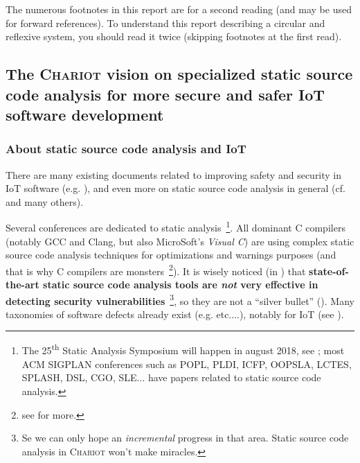 The numerous footnotes in this report are for a second reading (and
may be used for forward references). To understand this report
describing a circular and reflexive system, you should read it twice
(skipping footnotes at the first read).

\bigskip

\subsection{The \textsc{Chariot} vision on specialized static source code analysis for more secure and safer IoT software development}

\subsubsection{About static source code analysis and IoT}

There are many existing documents related to improving safety and
security in IoT software (e.g. \cite{Chen:2011:DAS, Medwed:2016:ISC}),
and even more on static source code analysis in general
(cf. \cite{Gomes2009AnOO, GosevaPopstojanova2015OnTC,
  Binkley:2007:SCA} and many others). %

Several conferences are dedicated to static analysis~\footnote{The
  25\textsuperscript{th} Static Analysis Symposium will happen in
  august 2018, see
  ; most ACM
  SIGPLAN conferences such as POPL, PLDI, ICFP, OOPSLA, LCTES, SPLASH,
  DSL, CGO, SLE... have papers related to static source code
  analysis.}.  All dominant C compilers (notably GCC and Clang, but
also MicroSoft's \emph{Visual C}\texttrademark) are using complex
static source code analysis techniques for optimizations and warnings
purposes (and that is why C compilers are monsters~\footnote{see
  for more.}). It is wisely noticed (in
\cite{GosevaPopstojanova2015OnTC}) that \textbf{state-of-the-art
  static source code analysis tools are \emph{not} very effective in
  detecting  security
  vulnerabilities}~\footnote{Se we can only hope an \emph{incremental}
  progress in that area. Static source code analysis in
  \textsc{Chariot} won't make miracles.}, so they are not a ``silver
bullet''  (\cite{Brooks:1987:NSB}). Many
taxonomies of software defects  already exist
(e.g. \cite{Silva:2016:SES, Wagner:2008:DCD, Levine:2009:DDE}
etc....), notably for IoT (see \cite{Carpent:2018:RRA,
  Ahmad:2018:ModelBasedIoT, Laszlo:2018:Vessedia}).

